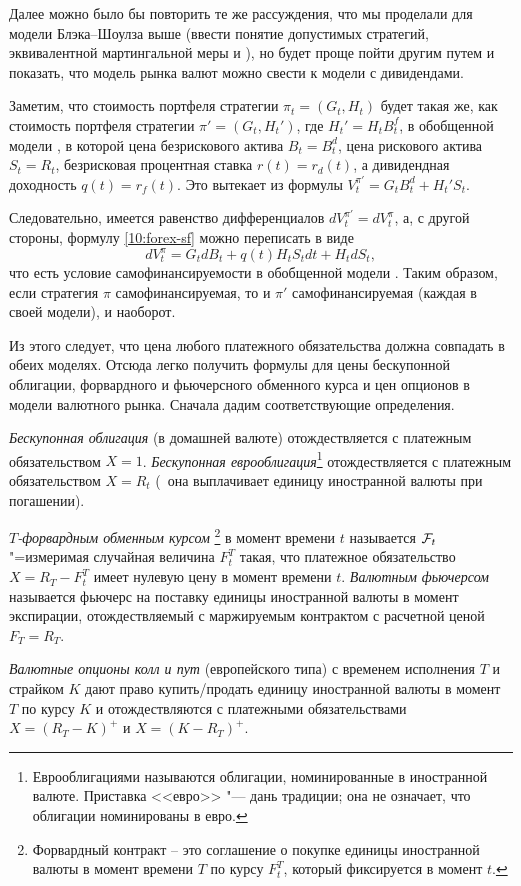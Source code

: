 \medskip
Далее можно было бы повторить те же рассуждения, что мы проделали для модели Блэка--Шоулза выше (ввести понятие допустимых стратегий, эквивалентной мартингальной меры и \td), но будет проще пойти другим путем и показать, что модель рынка валют можно свести к модели с дивидендами.

Заметим, что стоимость портфеля стратегии $\pi_t=(G_t,H_t)$ будет такая же, как стоимость портфеля стратегии $\pi'=(G_t,H_t')$, где $H_t' = H_tB_t^f$, в обобщенной модели \bs, в которой цена безрискового актива $B_t=B_t^d$, цена рискового актива $S_t=R_t$, безрисковая процентная ставка $r(t) = r_d(t)$, а дивидендная доходность $q(t) = r_f(t)$.
Это вытекает из формулы $V_t^{\pi'} = G_t B_t^d  + H_t' S_t$. 

Следовательно, имеется равенство дифференциалов $d V_t^{\pi'} = d V_t^{\pi}$, а, с другой стороны, формулу \eqref{10:forex-sf} можно переписать в виде
\[
dV_t^{\pi} =  G_t d B_t + q(t) H_t S_t dt + H_t d S_t,
\]
что есть условие самофинансируемости в обобщенной модели \bs.
Таким образом, если стратегия $\pi$ самофинансируемая, то и $\pi'$ самофинансируемая (каждая в своей модели), и наоборот.

Из этого следует, что цена любого платежного обязательства должна совпадать в обеих моделях. 
Отсюда легко получить формулы для цены бескупонной облигации, форвардного и фьючерсного обменного курса и цен опционов в модели валютного рынка.
Сначала дадим соответствующие определения.

\begin{definition}
\emph{Бескупонная облигация} (в домашней валюте) отождествляется с платежным обязательством $X=1$.
\emph{Бескупонная еврооблигация}\footnote{Еврооблигациями называются облигации, номинированные в иностранной валюте. Приставка <<евро>> "--- дань традиции; она не означает, что облигации номинированы в евро.} отождествляется с платежным обязательством $X=R_t$ (\te\ она выплачивает единицу иностранной валюты при погашении).

\emph{$T$-форвардным обменным курсом}%
\footnote{Форвардный контракт -- это соглашение о покупке единицы иностранной валюты в момент времени $T$ по курсу $F_t^T$, который фиксируется в момент $t$.}
в момент времени $t$ называется $\mathcal{F}_t$"=измеримая случайная величина $F_t^T$ такая, что платежное обязательство $X=R_T - F_t^T$ имеет нулевую цену в момент времени $t$. \emph{Валютным фьючерсом} называется фьючерс на поставку единицы иностранной валюты в момент экспирации, отождествляемый с маржируемым контрактом с расчетной ценой $F_T=R_T$.

\emph{Валютные опционы колл и пут} (европейского типа) с временем исполнения $T$ и страйком $K$ дают право купить/продать единицу иностранной валюты в момент $T$ по курсу $K$ и отождествляются с платежными обязательствами $X= (R_T - K)^+$ и $X=(K-R_T)^+$.
\end{definition}

